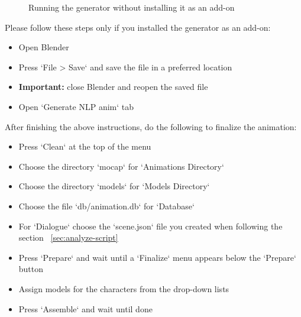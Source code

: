 \begin{figure}[!ht]
	\centerline{}
	\caption{Running the generator without installing it as an add-on}\label{fig:withoutaddon}
\end{figure}

Please follow these steps only if you installed the generator as an add-on:
\begin{itemize}
	\item Open Blender
	\item Press `File > Save` and save the file in a preferred location
	\item \textbf{Important:} close Blender and reopen the saved file
	\item Open `Generate NLP anim` tab
\end{itemize}

\noindent After finishing the above instructions, do the following to finalize the animation:
\begin{itemize}
	\item Press `Clean` at the top of the menu
	\item Choose the directory `mocap` for `Animations Directory`
	\item Choose the directory `models` for `Models Directory`
	\item Choose the file `db/animation.db` for `Database`
	\item For `Dialogue` choose the `scene.json` file you created when following the section ~\ref{sec:analyze-script}
	\item Press `Prepare` and wait until a `Finalize` menu appears below the `Prepare` button
	\item Assign models for the characters from the drop-down lists
	\item Press `Assemble` and wait until done
\end{itemize}

